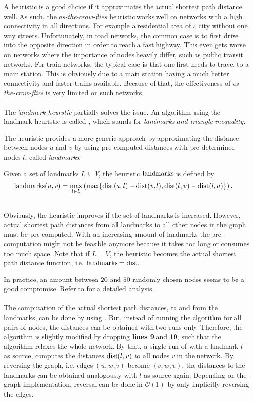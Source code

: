 	A heuristic is a good choice if it approximates the actual shortest path distance well. As such, the \textit{as-the-crow-flies} heuristic works well
	on networks with a high connectivity in all directions. For example a residential area of a city without one way streets. Unfortunately, in road
	networks, the common case is to first drive into the opposite direction in order to reach a fast highway. This even gets worse on networks
	where the importance of nodes heavily differ, such as public transit networks. For train networks, the typical case is that one first needs
	to travel to a main station. This is obviously due to a main station having a much better connectivity and faster trains available.
	Because of that, the effectiveness of \textit{as-the-crow-flies} is very limited on such networks.\\\\
	The \textit{landmark heurstic} partially solves the issue. An \astar algorithm using the landmark heuristic is called \alt {},
	which stands for \textit{landmarks and triangle inequality}.
	
	The heuristic provides a more generic approach by approximating the distance
	between nodes $u$ and $v$ by using pre-computed distances with pre-determined nodes $l$, called \textit{landmarks}.
	\begin{mydef}
		Given a set of landmarks $L \subseteq V$, the heuristic $\operatorname{landmarks}$ is defined by
		\begin{align*}
			\operatorname{landmarks}(u, v)	&= \max_{l \in L} \left(\max \{\operatorname{dist}(u, l) - \operatorname{dist}(v, l), \operatorname{dist}(l, v) - \operatorname{dist}(l, u)\}\right).
		\end{align*}
	\end{mydef}\quad\\
	Obviously, the heuristic improves if the set of landmarks is increased. However, actual shortest path distances from all landmarks
	to all other nodes in the graph must be pre-computed. With an increasing amount of landmarks the pre-computation might not
	be feasible anymore because it takes too long or consumes too much space. Note that if $L = V$, the heuristic becomes the
	actual shortest path distance function, i.e. $\operatorname{landmarks} = \operatorname{dist}$.
	
	In practice, an amount between $20$ and $50$ randomly chosen nodes seems to be a good compromise.
	Refer to  for a detailed analysis.\\\\
	The computation of the actual shortest path distances, to and from the landmarks, can be done by using \dijkstra. But, instead of
	running the algorithm for all pairs of nodes, the distances can be obtained with two runs only. Therefore, the algorithm is slightly modified by dropping
	\textbf{lines 9} and \textbf{10}, such that the algorithm relaxes the whole network. By that, a single run of \dijkstra with a landmark $l$ as source,
	computes the distances $\operatorname{dist}(l, v)$ to all nodes $v$ in the network. By reversing the graph, i.e. edges $(u, w, v)$ become $(v, w, u)$, the distances to
	the landmarks can be obtained analogously with $l$ as source again. Depending on the graph implementation, reversal can be done
	in $\mathcal{O}(1)$ by only implicitly reversing the edges.

